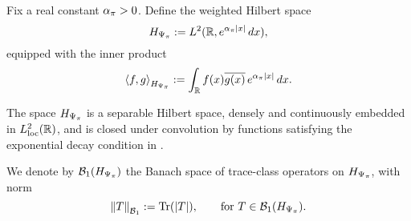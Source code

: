 \begin{definition}
\label{def:Hilbert_space_Lpi}
Fix a real constant \( \alpha_{\pi} > 0 \). Define the weighted Hilbert space
\[
H_{\Psi_{\pi}} := L^2(\mathbb{R}, e^{\alpha_{\pi} |x|} \, dx),
\]
equipped with the inner product
\[
\left\langle f, g \right\rangle_{H_{\Psi_{\pi}}} := \int_{\mathbb{R}} f(x) \overline{g(x)} \, e^{\alpha_{\pi} |x|} \, dx.
\]

The space \( H_{\Psi_{\pi}} \) is a separable Hilbert space, densely and continuously embedded in \( L^2_{\mathrm{loc}}(\mathbb{R}) \), and is closed under convolution by functions satisfying the exponential decay condition in .

We denote by \( \mathcal{B}_1(H_{\Psi_{\pi}}) \) the Banach space of trace-class operators on \( H_{\Psi_{\pi}} \), with norm
\[
\left\|T\right\|_{\mathcal{B}_1} := \operatorname{Tr}(|T|), \qquad \text{for } T \in \mathcal{B}_1(H_{\Psi_{\pi}}).
\]
\end{definition}
